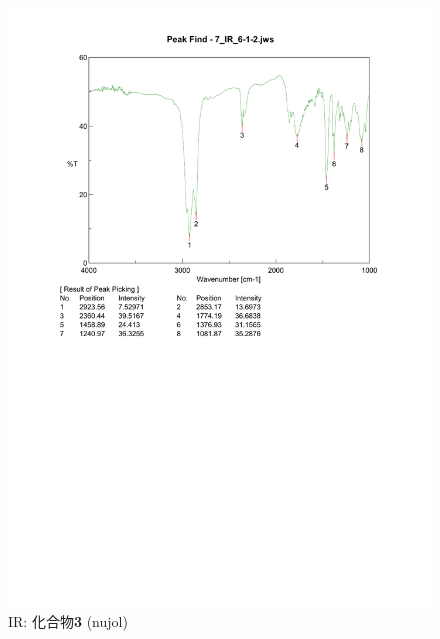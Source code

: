 \documentclass{ltjsarticle}
\theoremstyle{definition}
\numberwithin{equation}{section}
\begin{document}
\begin{figure}[htbp]
\begin{center}
\includegraphics[width = 15 cm]{IR_6-1-2.pdf}
\caption{IR: 化合物\textbf{3} (nujol)}
\label{IR_6-1-2}
\end{center}
\end{figure}
\end{document}
